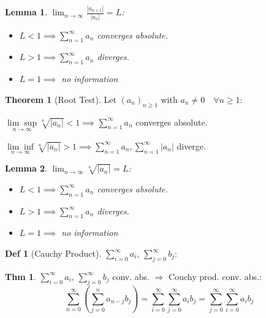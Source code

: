 \documentclass[a4paper, 10pt]{article}
\newtheorem*{lemma}{Lemma}
\theoremstyle{definition}
\newtheorem*{theorem}{Thm}
\newtheorem*{definition}{Def}
\theoremstyle{ex}
\theoremstyle{named}
\newtheorem*{ntheorem_wrapper}{Theorem}
\newenvironment{ntheorem}%
    {\begin{mdframed}[style=important]\begin{ntheorem_wrapper}}%
    {\end{ntheorem_wrapper}\end{mdframed}}
\begin{document}
\begin{lemma}
    $\lim_{n\to\infty} \frac{|a_{n+1}|}{|a_n|} = L$:

    \begin{itemize}
        \item $L < 1 \implies \sum_{n=1}^\infty a_n$ converges absolute.
        \item $L > 1 \implies \sum_{n=1}^\infty a_n$ diverges.
        \item $L = 1 \implies$ no information
    \end{itemize}
\end{lemma}

\begin{ntheorem}[Root Test]
    Let $(a_n)_{n \geq 1}$ with $a_n \neq 0 \quad \forall n\geq 1$:

    $\underset{n\to\infty}{\lim\sup} \sqrt[n]{|a_n|} < 1 \implies \sum_{n=1}^\infty a_n$ converges absolute.

    $\underset{n\to\infty}{\lim\inf} \sqrt[n]{|a_n|} > 1 \implies \sum_{n=1}^\infty a_n, \sum_{n=1}^\infty |a_n|$ diverge.
\end{ntheorem}

\begin{lemma}
    $\lim_{n\to\infty} \sqrt[n]{|a_n|} = L$:

    \begin{itemize}
        \item $L < 1 \implies \sum_{n=1}^\infty a_n$ converges absolute.
        \item $L > 1 \implies \sum_{n=1}^\infty a_n$ diverges.
        \item $L = 1 \implies$ no information
    \end{itemize}
\end{lemma}

\begin{definition}[Cauchy Product]
    $\sum_{i=0}^\infty a_i$, $\sum_{j=0}^\infty b_j$: \\
\end{definition}

\begin{theorem}
    $\sum\limits_{i=0}^\infty a_i$, $\sum\limits_{j=0}^\infty b_j$ conv. abs. $\Rightarrow$ Couchy prod. conv. abs.:
    $$\sum_{n=0}^\infty (\sum_{j=0}^n a_{n-j}b_j) = \sum_{i=0}^\infty \sum_{j=0}^\infty a_i b_j = \sum_{j=0}^\infty \sum_{i=0}^\infty a_i b_j$$
\end{theorem}
\end{document}
